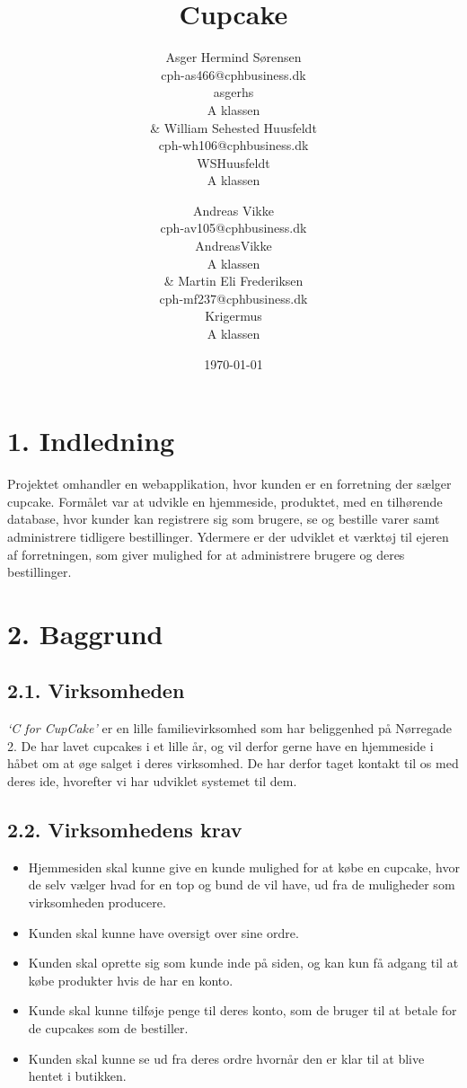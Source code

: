 \documentclass[11pt]{report}
\title{Cupcake}
\author{
    Asger Hermind Sørensen\\
    cph-as466@cphbusiness.dk\\
    asgerhs\\
    A klassen\\
  &
    William Sehested Huusfeldt\\
    cph-wh106@cphbusiness.dk\\
    WSHuusfeldt\\
    A klassen
  \and
    Andreas Vikke\\
    cph-av105@cphbusiness.dk\\
    AndreasVikke\\
    A klassen\\
  &
    Martin Eli Frederiksen\\
    cph-mf237@cphbusiness.dk\\
    Krigermus\\
    A klassen
}
\date{\today}
\begin{document}
\maketitle

\renewcommand{\cftchapleader}{\cftdotfill{\cftdotsep}}
\tableofcontents
\newpage

\chapter*{1. Indledning}
Projektet omhandler en webapplikation, hvor kunden er en forretning
der sælger cupcake. Formålet var at udvikle en hjemmeside, produktet, med en tilhørende database, hvor kunder kan registrere sig som brugere, se og bestille varer samt administrere tidligere bestillinger. Ydermere er der udviklet et værktøj til ejeren af forretningen, som giver mulighed for at administrere brugere og deres bestillinger.
\newpage

\chapter*{2. Baggrund}
\section*{2.1. Virksomheden}
\textit{‘C for CupCake’} er en lille familievirksomhed som har
beliggenhed på Nørregade 2. De har lavet cupcakes i et lille år, og vil derfor gerne
have en hjemmeside i håbet om at øge salget i deres virksomhed. De har
derfor taget kontakt til os med deres ide, hvorefter vi har udviklet
systemet til dem.

\section*{2.2. Virksomhedens krav}
\begin{itemize}
  \item Hjemmesiden skal kunne give en kunde mulighed for at købe en
    cupcake, hvor de selv vælger hvad for en top og bund de vil have,
    ud fra de muligheder som virksomheden producere. 
  \item Kunden skal kunne have oversigt over sine ordre. 
  \item Kunden skal oprette sig som kunde inde på siden, og kan kun få
    adgang til at købe produkter hvis de har en konto.
  \item Kunde skal kunne tilføje penge til deres konto, som de bruger
    til at betale for de cupcakes som de bestiller.
  \item Kunden skal kunne se ud fra deres ordre hvornår den er klar
    til at blive hentet i butikken.
\end{itemize}
\end{document}
